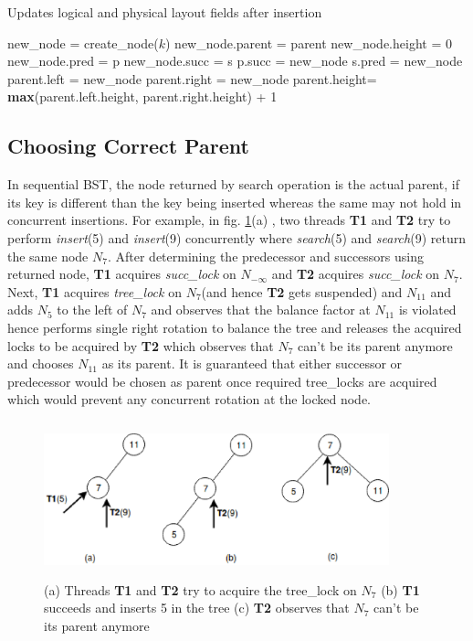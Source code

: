 \documentclass[MTech]{iitmdiss}
\begin{document}
\begin{algorithm}
\caption{Updates logical and physical layout fields after insertion}
\label{alg:update}
\begin{algorithmic}[1]
\State new\_node = create\_node($k$)
\State new\_node.parent = parent
\State new\_node.height = 0
\State new\_node.pred = p
\State new\_node.succ = s
\State p.succ = new\_node
\State s.pred = new\_node
    \State parent.left = new\_node
\Else \State parent.right = new\_node
\EndIf
\State parent.height= \textbf{max}(parent.left.height, parent.right.height) + 1
\EndFunction
\end{algorithmic}
\end{algorithm}

\subsection{Choosing Correct Parent}
In sequential BST, the node returned by search operation is the actual parent, if its key is different than the key being inserted whereas the same may not hold in concurrent insertions. For example, in fig. \ref{fig:concurrent_insert}(a) , two threads \textbf{T1} and \textbf{T2} try to perform \textit{insert}(5) and \textit{insert}(9) concurrently where \textit{search}(5) and \textit{search}(9) return the same node $N_7$. After determining the predecessor and successors using returned node, \textbf{T1} acquires \textit{succ\_lock} on $N_{-\infty}$ and \textbf{T2} acquires \textit{succ\_lock} on $N_7$. Next, \textbf{T1} acquires \textit{tree\_lock} on $N_7$(and hence \textbf{T2} gets suspended) and $N_{11}$ and adds $N_5$ to the left of $N_7$ and observes that the balance factor at $N_{11}$ is violated hence performs single right rotation to balance the tree and releases the acquired locks to be acquired by \textbf{T2} which observes that $N_7$ can't be its parent anymore and chooses $N_{11}$ as its parent. It is guaranteed that either successor or predecessor would be chosen as parent once required tree\_locks are acquired which would prevent any concurrent rotation at the locked node. 

\begin{figure}
\centering
\includegraphics[width=10cm, height=4.5cm]{Concurrent_insert}
\caption{(a) Threads \textbf{T1} and \textbf{T2} try to acquire the tree\_lock on $N_7$ (b) \textbf{T1} succeeds and inserts 5 in the tree (c) \textbf{T2} observes that $N_7$ can't be its parent anymore}
\label{fig:concurrent_insert}
\end{figure}
\end{document}
